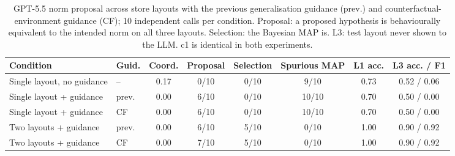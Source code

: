 \begin{table}[t]
\centering\small
\caption{GPT-5.5 norm proposal across store layouts with the previous generalisation guidance (prev.) and counterfactual-environment guidance (CF); 10 independent calls per condition. Proposal: a proposed hypothesis is behaviourally equivalent to the intended norm on all three layouts. Selection: the Bayesian MAP is. L3: test layout never shown to the LLM. c1 is identical in both experiments.}
\label{tab:layout-generalization-cf}
\begin{tabular}{llcccccc}
\toprule
Condition & Guid. & Coord. & Proposal & Selection & Spurious MAP & L1 acc. & L3 acc. / F1 \\
\midrule
Single layout, no guidance & -- & 0.17 & 0/10 & 0/10 & 9/10 & 0.73 & 0.52 / 0.06 \\
Single layout + guidance & prev. & 0.00 & 6/10 & 0/10 & 10/10 & 0.70 & 0.50 / 0.00 \\
Single layout + guidance & CF & 0.00 & 6/10 & 0/10 & 10/10 & 0.70 & 0.50 / 0.00 \\
Two layouts + guidance & prev. & 0.00 & 6/10 & 5/10 & 0/10 & 1.00 & 0.90 / 0.92 \\
Two layouts + guidance & CF & 0.00 & 7/10 & 5/10 & 0/10 & 1.00 & 0.90 / 0.92 \\
\bottomrule
\end{tabular}
\end{table}
